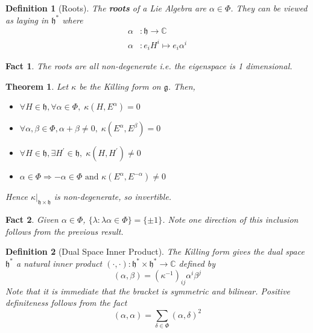 \documentclass{article}
\newtheorem{theorem}{Theorem}[subsection]
\newtheorem{definition}{Definition}[subsection]
\newtheorem{fact}{Fact}[subsection]
\newcommand{\bam}[1]{\textbf{#1}}
\newcommand{\mf}[1]{\mathfrak{#1}}
\newcommand{\mbb}[1]{\mathbb{#1}}
\begin{document}
\begin{definition}[Roots]
The \bam{roots} of a Lie Algebra are $\alpha\in\Phi$. They can be viewed as laying in $\mf{h}^\ast$ where 
\begin{align*}
\alpha &:\mf{h}\to\mbb{C} \\
\alpha &: e_i H^i \mapsto e_i \alpha^i
\end{align*}
\end{definition}

\begin{fact}
The roots are all non-degenerate i.e. the eigenspace is 1 dimensional. 
\end{fact}

\begin{theorem}
Let $\kappa$ be the Killing form on $\mf{g}$. Then, 
\begin{itemize}
    \item $\forall H\in\mf{h}, \forall\alpha\in\Phi, \; \kappa\left(H,E^\alpha\right)=0 $
    \item $\forall\alpha,\beta\in\Phi, \alpha+\beta\neq0, \; \kappa\left(E^\alpha,E^\beta\right)=0$
    \item $\forall H\in\mf{h}, \exists H^\prime\in\mf{h}, \; \kappa\left(H,H^\prime\right)\neq0$
    \item $\alpha\in\Phi \Rightarrow -\alpha\in\Phi \text{ and } \kappa\left(E^\alpha,E^{-\alpha}\right)\neq0$
\end{itemize}
Hence $\kappa|_{\mf{h}\times\mf{h}}$ is non-degenerate, so invertible. 
\end{theorem}

\begin{fact}
Given $\alpha\in\Phi$, $\lbrace \lambda : \lambda\alpha\in\Phi \rbrace = \lbrace \pm1 \rbrace$. Note one direction of this inclusion follows from the previous result. 
\end{fact}

\begin{definition}[Dual Space Inner Product]
The Killing form gives the dual space $\mf{h}^\ast$ a natural inner product $(\cdot,\cdot):\mf{h}^\ast \times \mf{h}^\ast \to \mbb{C}$ defined by 
\[
(\alpha, \beta) = \left(\kappa^{-1}\right)_{ij} \alpha^i \beta^j
\]
Note that it is immediate that the bracket is symmetric and bilinear. Positive definiteness follows from the fact
\[
(\alpha, \alpha)=\sum_{\delta\in\Phi} (\alpha, \delta)^2
\]
\end{definition}
\end{document}
